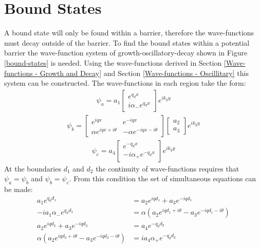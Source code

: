 			\section{Bound States}
			\label{Rectangular Barrier - Bound States}
				A bound state will only be found within a barrier, therefore the wave-functions must decay outside of the barrier. To find the bound states within a potential barrier the wave-function system of growth-oscillatory-decay shown in Figure \ref{bound-states} is needed. Using the wave-functions derived in Section \ref{Wave-functions - Growth and Decay} and Section \ref{Wave-functions - Oscillitary} this system can be constructed. The wave-functions in each region take the form:
				\begin{align}
					\psi_{a}=a_{1}
					\left[\begin{array}{ccc}
						e^{q_{d}x}\\
						i\alpha_{-}e^{q_{d}x}
					\end{array}\right]e^{ik_{y}y}
				\end{align}
				\begin{align}
					\psi_{b}=
					\left[\begin{array}{ccc}
						e^{iqx}&e^{-iqx}\\
						\alpha e^{iqx+i\theta}&-\alpha e^{-iqx-i\theta}
					\end{array}\right]
					\left[\begin{array}{ccc}
						a_{2}\\
						a_{3}
					\end{array}\right]e^{ik_{y}y}
				\end{align}
				\begin{align}
					\psi_{c}=a_{4}
					\left[\begin{array}{ccc}
						e^{-q_{d}x}\\
						-i\alpha_{+}e^{-q_{d}x}
					\end{array}\right]e^{ik_{y}y}
				\end{align}
				At the boundaries $d_{1}$ and $d_{2}$ the continuity of wave-functions requires that $\psi_{a}=\psi_{b}$ and $\psi_{b}=\psi_{c}$. From this condition the set of simultaneous equations can be made:
				\begin{align}
					a_{1}e^{q_{d}d_{1}}&=a_{2}e^{iqd_{1}}+a_{3}e^{-iqd_{1}}\\
					-ia_{1}\alpha_{-}e^{q_{d}d_{1}}&=\alpha\left(a_{2}e^{iqd_{1}+i\theta}-a_{3}e^{-iqd_{1}-i\theta}\right)\\
					a_{2}e^{iqd_{2}}+a_{3}e^{-iqd_{2}}&=a_{4}e^{-q_{d}d_{2}}\\
					\alpha\left(a_{2}e^{iqd_{2}+i\theta}-a_{3}e^{-iqd_{2}-i\theta}\right)&=ia_{4}\alpha_{+}e^{-q_{d}d_{2}}
				\end{align}
